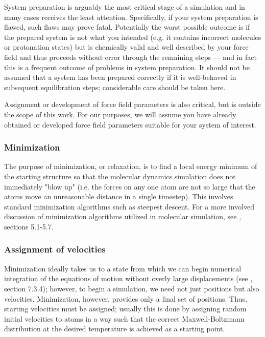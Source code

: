 \documentclass[9pt,bestpractices]{livecoms}
\begin{document}
System preparation is arguably the most critical stage of a simulation and in many cases receives the least attention.
Specifically, if your system preparation is flawed, such flaws may prove fatal.
Potentially the worst possible outcome is if the prepared system is not what you intended (e.g. it contains incorrect molecules or protonation states) but is chemically valid and well described by your force field and thus proceeds without error through the remaining steps --- and in fact this is a  frequent outcome of problems in system preparation.
It should not be assumed that a system has been prepared correctly if it is well-behaved in subsequent equilibration steps; considerable care should be taken here.

Assignment or development of force field parameters is also critical, but is outside the scope of this work.
For our purposes, we will assume you have already obtained or developed force field parameters suitable for your system of interest.

\subsubsection{Minimization}

The purpose of minimization, or relaxation, is to find a local energy minimum of the starting structure so that the molecular dynamics simulation does not immediately "blow up" (i.e. the forces on any one atom are not so large that the atoms move an unreasonable distance in a single timestep).
This involves standard minimization algorithms such as steepest descent.
For a more involved discussion of minimization algorithms utilized in molecular simulation, see \citet{LeachBook}, sections 5.1-5.7.

\subsubsection{Assignment of velocities}
Minimization ideally takes us to a state from which we can begin numerical integration of the equations of motion without overly large displacements (see \citet{LeachBook}, section 7.3.4); however, to begin a simulation, we need not just positions but also velocities.
Minimization, however, provides only a final set of positions.
Thus, starting velocities must be assigned; usually this is done by assigning random initial velocities to atoms in a way such that the correct Maxwell-Boltzmann distribution at the desired temperature is achieved as a starting point.
\end{document}
